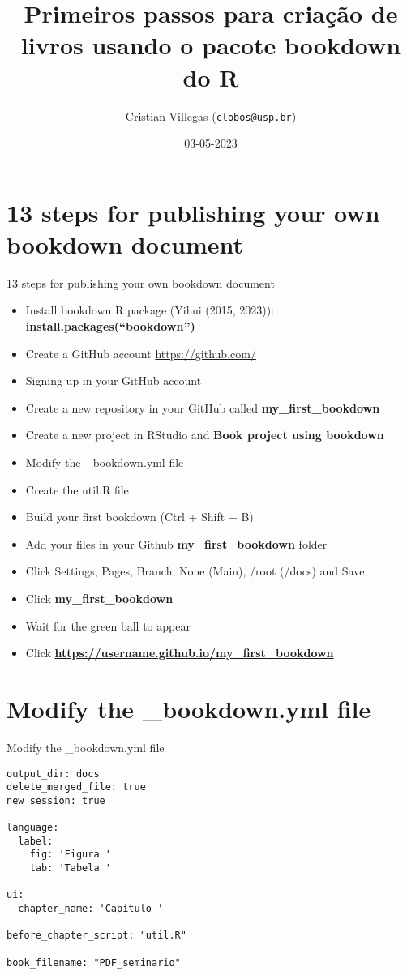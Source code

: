 \documentclass[
  ignorenonframetext,
]{beamer}
\title{Primeiros passos para criação de livros usando o pacote bookdown
do R}
\author{Cristian Villegas
(\href{mailto:clobos@usp.br}{\nolinkurl{clobos@usp.br}})}
\date{03-05-2023}
\institute{USP, Departamento de Ciências Exatas}
\providecommand{\tightlist}{%
  \setlength{\itemsep}{0pt}\setlength{\parskip}{0pt}}
\begin{document}
\frame{\titlepage}

\hypertarget{steps-for-publishing-your-own-bookdown-document}{%
\section{13 steps for publishing your own bookdown
document}\label{steps-for-publishing-your-own-bookdown-document}}

\begin{frame}{13 steps for publishing your own bookdown document}
\protect\hypertarget{steps-for-publishing-your-own-bookdown-document-1}{}
\begin{itemize}
\tightlist
\item
  Install bookdown R package (Yihui (2015, 2023)):
  \textbf{install.packages(``bookdown'')}
\item
  Create a GitHub account \url{https://github.com/}
\item
  Signing up in your GitHub account
\item
  Create a new repository in your GitHub called
  \textbf{my\_first\_bookdown}
\item
  Create a new project in RStudio and \textbf{Book project using
  bookdown}
\item
  Modify the \_bookdown.yml file
\item
  Create the util.R file
\item
  Build your first bookdown (Ctrl + Shift + B)
\item
  Add your files in your Github \textbf{my\_first\_bookdown} folder
\item
  Click Settings, Pages, Branch, None (Main), /root (/docs) and Save
\item
  Click \textbf{my\_first\_bookdown}
\item
  Wait for the green ball to appear
\item
  Click \textbf{\url{https://username.github.io/my_first_bookdown}}
\end{itemize}
\end{frame}

\hypertarget{modify-the-_bookdown.yml-file}{%
\section{Modify the \_bookdown.yml
file}\label{modify-the-_bookdown.yml-file}}

\begin{frame}[fragile]{Modify the \_bookdown.yml file}
\protect\hypertarget{modify-the-_bookdown.yml-file-1}{}
\begin{verbatim}
output_dir: docs
delete_merged_file: true
new_session: true

language:
  label:
    fig: 'Figura '
    tab: 'Tabela '

ui:
  chapter_name: 'Capítulo '
  
before_chapter_script: "util.R"

book_filename: "PDF_seminario" 
\end{verbatim}
\end{frame}
\end{document}
